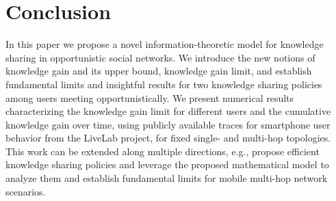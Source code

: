 \documentclass[conference]{IEEEtran}
\theoremstyle{definition}
\begin{document}
\vspace{-0.3 cm}
\section{Conclusion}
In this paper we propose a novel information-theoretic model for knowledge sharing in opportunistic social networks. We introduce the new notions of knowledge gain and its upper bound, knowledge gain limit, and establish fundamental limits and insightful results for two knowledge sharing policies among users meeting opportunistically. We present numerical results characterizing the knowledge gain limit for different users and the cumulative knowledge gain over time, using publicly available traces for smartphone user behavior from the LiveLab project, for fixed single- and multi-hop topologies. This work can 
be extended along multiple directions, e.g., propose efficient knowledge sharing policies and leverage the proposed mathematical model to analyze them and establish fundamental limits for mobile multi-hop network scenarios.









\vspace{-0.2 cm}
{\footnotesize {


}}
\end{document}
